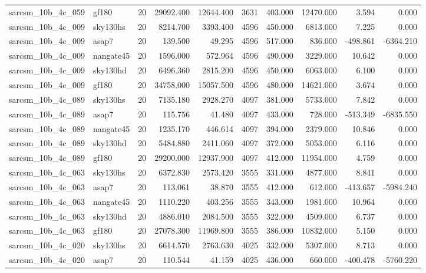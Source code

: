 \begin{longtable}{llrrrrrrrr}
sarcsm\_10b\_4c\_059 & gf180 & 20 & 29092.400 & 12644.400 & 3631 & 403.000 & 12470.000 & 3.594 & 0.000 \\
sarcsm\_10b\_4c\_009 & sky130hs & 20 & 8214.700 & 3393.400 & 4596 & 450.000 & 6813.000 & 7.225 & 0.000 \\
sarcsm\_10b\_4c\_009 & asap7 & 20 & 139.500 & 49.295 & 4596 & 517.000 & 836.000 & -498.861 & -6364.210 \\
sarcsm\_10b\_4c\_009 & nangate45 & 20 & 1596.000 & 572.964 & 4596 & 490.000 & 3229.000 & 10.642 & 0.000 \\
sarcsm\_10b\_4c\_009 & sky130hd & 20 & 6496.360 & 2815.200 & 4596 & 450.000 & 6063.000 & 6.100 & 0.000 \\
sarcsm\_10b\_4c\_009 & gf180 & 20 & 34758.000 & 15057.500 & 4596 & 480.000 & 14621.000 & 3.674 & 0.000 \\
sarcsm\_10b\_4c\_089 & sky130hs & 20 & 7135.180 & 2928.270 & 4097 & 381.000 & 5733.000 & 7.842 & 0.000 \\
sarcsm\_10b\_4c\_089 & asap7 & 20 & 115.756 & 41.480 & 4097 & 433.000 & 728.000 & -513.349 & -6835.550 \\
sarcsm\_10b\_4c\_089 & nangate45 & 20 & 1235.170 & 446.614 & 4097 & 394.000 & 2379.000 & 10.846 & 0.000 \\
sarcsm\_10b\_4c\_089 & sky130hd & 20 & 5484.880 & 2411.060 & 4097 & 372.000 & 5053.000 & 6.116 & 0.000 \\
sarcsm\_10b\_4c\_089 & gf180 & 20 & 29200.000 & 12937.900 & 4097 & 412.000 & 11954.000 & 4.759 & 0.000 \\
sarcsm\_10b\_4c\_063 & sky130hs & 20 & 6372.830 & 2573.420 & 3555 & 331.000 & 4877.000 & 8.841 & 0.000 \\
sarcsm\_10b\_4c\_063 & asap7 & 20 & 113.061 & 38.870 & 3555 & 412.000 & 612.000 & -413.657 & -5984.240 \\
sarcsm\_10b\_4c\_063 & nangate45 & 20 & 1110.220 & 403.256 & 3555 & 343.000 & 1981.000 & 10.964 & 0.000 \\
sarcsm\_10b\_4c\_063 & sky130hd & 20 & 4886.010 & 2084.500 & 3555 & 322.000 & 4509.000 & 6.737 & 0.000 \\
sarcsm\_10b\_4c\_063 & gf180 & 20 & 27078.300 & 11969.800 & 3555 & 386.000 & 10832.000 & 5.150 & 0.000 \\
sarcsm\_10b\_4c\_020 & sky130hs & 20 & 6614.570 & 2763.630 & 4025 & 332.000 & 5307.000 & 8.713 & 0.000 \\
sarcsm\_10b\_4c\_020 & asap7 & 20 & 110.544 & 41.159 & 4025 & 436.000 & 660.000 & -400.478 & -5760.220 \\

\end{longtable}
